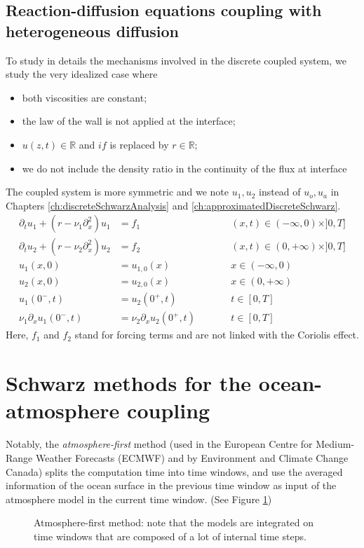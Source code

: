 \subsection{Reaction-diffusion equations coupling
with heterogeneous diffusion}
\label{sec:airseaSCM_reactionDiffusionSection}
To study in details the mechanisms involved in
the discrete coupled system, we study the very idealized
case where
\begin{itemize}
	\item both viscosities are constant;
	\item the law of the wall is not applied
		at the interface;
	\item $u(z,t) \in\mathbb{R}$ and $if$ is replaced by
		$r\in\mathbb{R}$;
	\item we do not include the density ratio
	in the continuity of the flux at interface
\end{itemize}
The coupled system is more symmetric and we note
$u_1, u_2$ instead of $u_o, u_a$ in Chapters
\ref{ch:discreteSchwarzAnalysis} and
\ref{ch:approximatedDiscreteSchwarz}.
\begin{subequations}
\begin{align}
\partial_t u_1 +( r - \nu_1 \partial_x^2) u_1 &= f_1  &\qquad& (x,t) \in (-\infty,0) \times ]0,T] \label{eq:dr1} \\
\partial_t u_2 + ( r - \nu_2 \partial_x^2) u_2  &= f_2  &\qquad& (x,t) \in (0,+\infty) \times ]0,T] \label{eq:dr2}\\
u_1(x,0) &= u_{1,0}(x)   &\qquad&  x \in (-\infty,0)  \\
u_2(x,0) &= u_{2,0}(x)   &\qquad&  x \in (0,+\infty) \\
u_1(0^-,t) &=  u_2(0^+,t) &\qquad& t \in [0,T] \label{eq:interface-dir} \\
\nu_1 \partial_x u_1(0^-,t) &= \nu_2 \partial_x u_2(0^+,t) &\qquad& t \in [0,T] \label{eq:interface-neu} 
\end{align}
\label{eq:model-problem}
\end{subequations}
Here, $f_1$ and $f_2$
stand for forcing terms and are not linked with the Coriolis effect.

\section{Schwarz methods for the ocean-atmosphere coupling}
Notably, the \textit{atmosphere-first} method
(used in the European Centre for Medium-Range Weather Forecasts
(ECMWF) and by Environment and Climate Change Canada)
splits the computation time into time windows, and use the
averaged information of the ocean surface in the previous
time window as input of the atmosphere model in the current
time window. (See Figure \ref{fig:airseaSCM_atmFirst})
\begin{figure}
\centering
\caption{Atmosphere-first method: note that the models are
	integrated on time windows that are composed of a lot
	of internal time steps.}
\label{fig:airseaSCM_atmFirst}
\end{figure}
